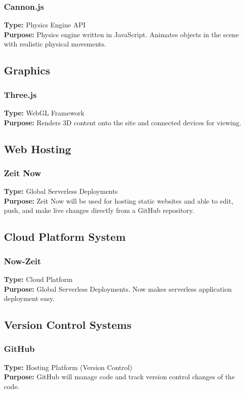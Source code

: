 \documentclass[onecolumn, draftclsnofoot,10pt, compsoc]{IEEEtran}
\begin{document}
\subsubsection{Cannon.js}
\textbf{Type:} Physics Engine API\\
\textbf{Purpose:} Physics engine written in JavaScript. Animates objects in the scene with realistic physical movements.

\subsection{Graphics}
\subsubsection{Three.js}
\textbf{Type:} WebGL Framework\\
\textbf{Purpose:} Renders 3D content onto the site and connected devices for viewing.

\subsection{Web Hosting}
\subsubsection{Zeit Now}
\textbf{Type:} Global Serverless Deployments\\
\textbf{Purpose:} Zeit Now will be used for hosting static websites and able to edit, push, and make live changes directly from a GitHub repository. 

\subsection{Cloud Platform System}
\subsubsection{Now-Zeit}
\textbf{Type:} Cloud Platform\\
\textbf{Purpose:} Global Serverless Deployments. Now makes serverless application deployment easy.

\subsection{Version Control Systems}
\subsubsection{GitHub}
\textbf{Type:} Hosting Platform (Version Control)\\
\textbf{Purpose:} GitHub will manage code and track version control changes of the code. 
\end{document}
